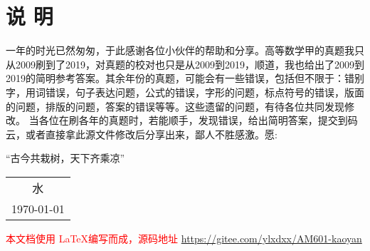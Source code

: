 




\chapter*{说 \quad 明}
\thispagestyle{empty}




一年的时光已然匆匆，于此感谢各位小伙伴的帮助和分享。高等数学甲的真题我只从2009刷到了2019，对真题的校对也只是从2009到2019，顺道，我也给出了2009到2019的简明参考答案。其余年份的真题，可能会有一些错误，包括但不限于：错别字，用词错误，句子表达问题，公式的错误，字形的问题，标点符号的错误，版面的问题，排版的问题，答案的错误等等。这些遗留的问题，有待各位共同发现修改。
当各位在刷各年的真题时，若能顺手，发现错误，给出简明答案，提交到码云，或者直接拿此源文件修改后分享出来，鄙人不胜感激。愿:
\begin{center}
	\kaishu 
	“古今共栽树，天下齐乘凉”
\end{center}
\begin{center}
	\flushright
	\begin{tabular}{c}
		水   \\
		\today
	\end{tabular}	
\end{center}

\vfil
\noindent
\textcolor{red}{本文档使用 \LaTeX 编写而成，源码地址 \url{https://gitee.com/ylxdxx/AM601-kaoyan}  }
\vfil

\pagestyle{mypagestyle}

